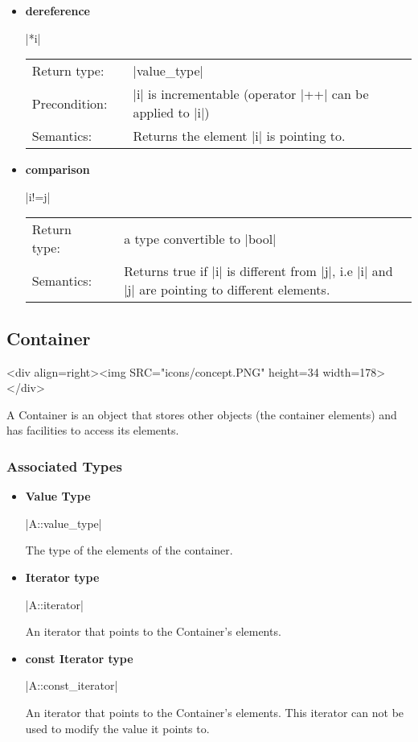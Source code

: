\documentclass[12pt,twoside]{report}
\begin{document}
\begin{itemize}
\item {\bf dereference}

  |*i|

  \begin{tabular}[!h]{l p{1cm} p{10cm}}
    Return type: & & |value_type|\\
    Precondition: & & |i| is incrementable (operator |++| can be applied to |i|)\\
    Semantics: & & Returns the element |i| is pointing to.\\
  \end{tabular}


\item {\bf comparison}

  |i!=j|

  \begin{tabular}[!h]{l p{1cm} p{10cm}}
    Return type: & & a type convertible to |bool|\\
    Semantics: & & Returns true if |i| is different from |j|, i.e |i| and |j| are pointing to different elements.\\
  \end{tabular}



\end{itemize}








\subsection{Container}
\label{concept:container}
\begin{htmlonly}
<div align=right><img SRC="icons/concept.PNG" height=34 width=178></div>
\end{htmlonly}

A Container is an object that stores other objects (the container elements) and has facilities to access its elements. 

\htmlrule[CLEAR=all]  \subsubsection*{Associated Types}


\begin{itemize}
\item {\bf Value Type}

  |A::value_type|

  The type of the elements of the container.


\item {\bf Iterator type}

  |A::iterator|

  An iterator that points to the Container's elements.


\item {\bf const Iterator type}

  |A::const_iterator|

  An iterator that points to the Container's elements. This iterator can not be used to modify the value it points to.



\end{itemize}
\end{document}
